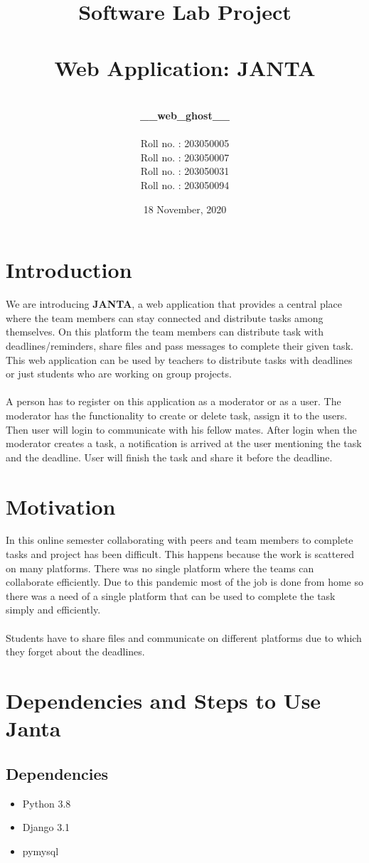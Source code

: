 \documentclass{article}
\title{\textbf{\huge{Software Lab Project\\ \\ Web Application: JANTA}}}
\author{\\\huge\textbf{{\_\_web\_ghost\_\_}}
\\
\\\huge{Roll no. : 203050005\\\huge Roll no. : 203050007\\\huge Roll no. : 203050031\\\huge Roll no. : 203050094}}
\date{\Large{18 November, 2020}}
\begin{document}
\begin{titlingpage}
        \maketitle
    \end{titlingpage}
    \newpage
\tableofcontents
\newpage

\section{Introduction}
\Large{We are introducing \textbf{JANTA}, a web application that provides a central place where the team members can stay connected and distribute tasks among themselves. On this platform the team members can distribute task with deadlines/reminders, share files and pass messages to complete their given task. This web application can be used by teachers to distribute tasks with deadlines or just students who are working on group projects.\\
\\
A person has to register on this application as a moderator or as a user. The moderator has the functionality to create or delete task, assign it to the users. Then user will login to communicate with his fellow mates. After login when the moderator creates a task, a notification is arrived at the user mentioning the task and the deadline. User will finish the task and share it before the deadline.
}
\newpage
\section{Motivation}
\Large{In this online semester collaborating with peers and team members to complete tasks and project has been difficult. This happens because the work is scattered on many platforms. There was no single platform where the teams can collaborate efficiently. Due to this pandemic most of the job is done from home so there was a need of a single platform that can be used to complete the task simply and efficiently.
\\\\
Students have to share files and communicate on different platforms due to which they forget about the deadlines.}

\newpage
\section{Dependencies and Steps to Use Janta}
\subsection{Dependencies}
\begin{itemize}
    \item Python 3.8
    \item Django 3.1
    \item pymysql 
\end{itemize}
\end{document}
